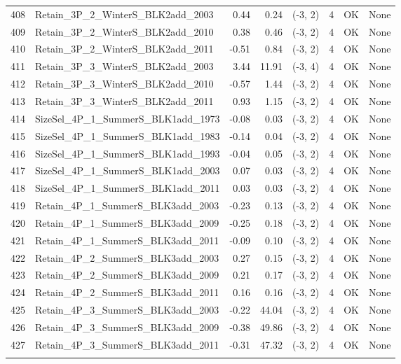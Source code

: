 \documentclass[12pt,]{article}
\begin{document}
\begin{landscape}
\begin{longtable}{rlrrcrcl}
  408 & Retain\_3P\_2\_WinterS\_BLK2add\_2003 & 0.44 & 0.24 & (-3, 2) & 4 & OK & None \\ 
  409 & Retain\_3P\_2\_WinterS\_BLK2add\_2010 & 0.38 & 0.46 & (-3, 2) & 4 & OK & None \\ 
  410 & Retain\_3P\_2\_WinterS\_BLK2add\_2011 & -0.51 & 0.84 & (-3, 2) & 4 & OK & None \\ 
  411 & Retain\_3P\_3\_WinterS\_BLK2add\_2003 & 3.44 & 11.91 & (-3, 4) & 4 & OK & None \\ 
  412 & Retain\_3P\_3\_WinterS\_BLK2add\_2010 & -0.57 & 1.44 & (-3, 2) & 4 & OK & None \\ 
  413 & Retain\_3P\_3\_WinterS\_BLK2add\_2011 & 0.93 & 1.15 & (-3, 2) & 4 & OK & None \\ 
  414 & SizeSel\_4P\_1\_SummerS\_BLK1add\_1973 & -0.08 & 0.03 & (-3, 2) & 4 & OK & None \\ 
  415 & SizeSel\_4P\_1\_SummerS\_BLK1add\_1983 & -0.14 & 0.04 & (-3, 2) & 4 & OK & None \\ 
  416 & SizeSel\_4P\_1\_SummerS\_BLK1add\_1993 & -0.04 & 0.05 & (-3, 2) & 4 & OK & None \\ 
  417 & SizeSel\_4P\_1\_SummerS\_BLK1add\_2003 & 0.07 & 0.03 & (-3, 2) & 4 & OK & None \\ 
  418 & SizeSel\_4P\_1\_SummerS\_BLK1add\_2011 & 0.03 & 0.03 & (-3, 2) & 4 & OK & None \\ 
  419 & Retain\_4P\_1\_SummerS\_BLK3add\_2003 & -0.23 & 0.13 & (-3, 2) & 4 & OK & None \\ 
  420 & Retain\_4P\_1\_SummerS\_BLK3add\_2009 & -0.25 & 0.18 & (-3, 2) & 4 & OK & None \\ 
  421 & Retain\_4P\_1\_SummerS\_BLK3add\_2011 & -0.09 & 0.10 & (-3, 2) & 4 & OK & None \\ 
  422 & Retain\_4P\_2\_SummerS\_BLK3add\_2003 & 0.27 & 0.15 & (-3, 2) & 4 & OK & None \\ 
  423 & Retain\_4P\_2\_SummerS\_BLK3add\_2009 & 0.21 & 0.17 & (-3, 2) & 4 & OK & None \\ 
  424 & Retain\_4P\_2\_SummerS\_BLK3add\_2011 & 0.16 & 0.16 & (-3, 2) & 4 & OK & None \\ 
  425 & Retain\_4P\_3\_SummerS\_BLK3add\_2003 & -0.22 & 44.04 & (-3, 2) & 4 & OK & None \\ 
  426 & Retain\_4P\_3\_SummerS\_BLK3add\_2009 & -0.38 & 49.86 & (-3, 2) & 4 & OK & None \\ 
  427 & Retain\_4P\_3\_SummerS\_BLK3add\_2011 & -0.31 & 47.32 & (-3, 2) & 4 & OK & None \\ 
   \hline
\hline
\label{tab:model_params}
\end{longtable}
\end{landscape}
\end{document}
